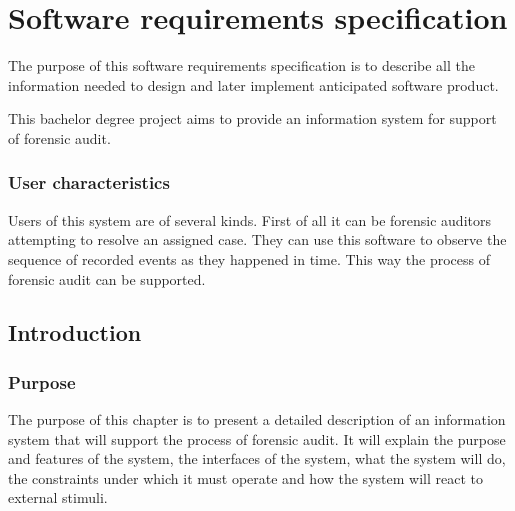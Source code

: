 \chapter{Software requirements specification}\label{SRS}


The purpose of this software requirements specification is to describe all the information needed to design and later implement anticipated software product. 

This bachelor degree project aims to provide an information system for support of forensic audit.  




\subsection{User characteristics}
Users of this system are of several kinds. First of all it can be forensic auditors attempting to resolve an assigned case. They can use this software to observe the sequence of recorded events as they happened in time. This way the process of forensic audit can be supported. 



\section{Introduction}
\subsection{Purpose}

The purpose of this chapter is to present a detailed description of an information system that will support the process of forensic audit. It will explain the purpose and features of the system, the interfaces of the system, what the system will do, the constraints under which it must operate and how the system will react to external stimuli.

